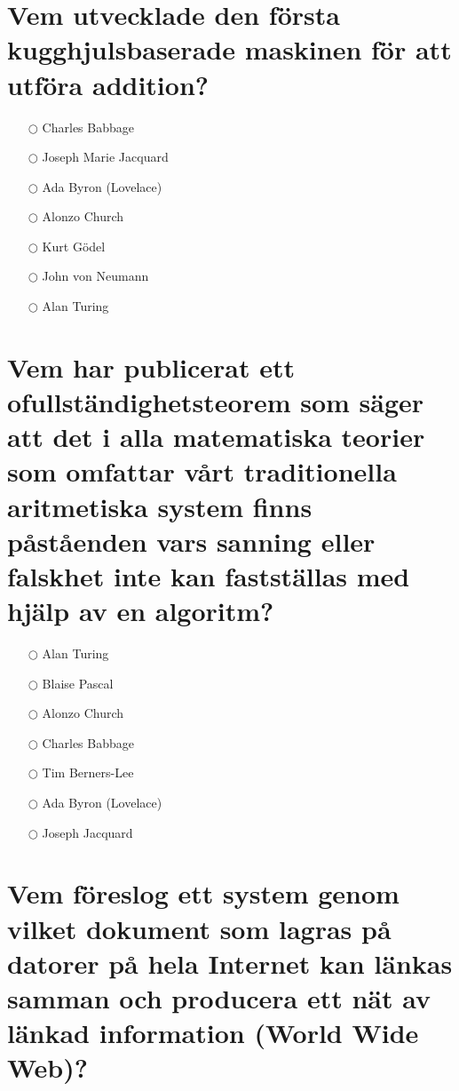 \documentclass[a4paper,11pt,oneside]{book}
\begin{document}
\begin{sloppypar}
\section{Vem utvecklade den f\"orsta kugghjulsbaserade maskinen f\"or att utf\"ora addition?}

\label{q:437:mc:sv:True}

\begin{itemize}
  \item[$\bigcirc$] Charles Babbage
  \item[$\bigcirc$] Joseph Marie Jacquard
  \item[$\bigcirc$] Ada Byron (Lovelace)
  \item[$\bigcirc$] Alonzo Church
  \item[$\bigcirc$] Kurt G\"odel
  \item[$\bigcirc$] John von Neumann
  \item[$\bigcirc$] Alan Turing
\end{itemize}



\section{Vem har publicerat ett ofullst\"andighetsteorem som s\"ager att det i alla matematiska teorier som omfattar v\r{a}rt traditionella aritmetiska system finns p\r{a}st\r{a}enden vars sanning eller falskhet inte kan fastst\"allas med hj\"alp av en algoritm?}

\label{q:438:mc:sv:True}

\begin{itemize}
  \item[$\bigcirc$] Alan Turing
  \item[$\bigcirc$] Blaise Pascal
  \item[$\bigcirc$] Alonzo Church
  \item[$\bigcirc$] Charles Babbage
  \item[$\bigcirc$] Tim Berners-Lee
  \item[$\bigcirc$] Ada Byron (Lovelace)
  \item[$\bigcirc$] Joseph Jacquard
\end{itemize}



\section{Vem f\"oreslog ett system genom vilket dokument som lagras p\r{a} datorer p\r{a} hela Internet kan l\"ankas samman och producera ett n\"at av l\"ankad information (World Wide Web)?}


\end{sloppypar}
\end{document}
